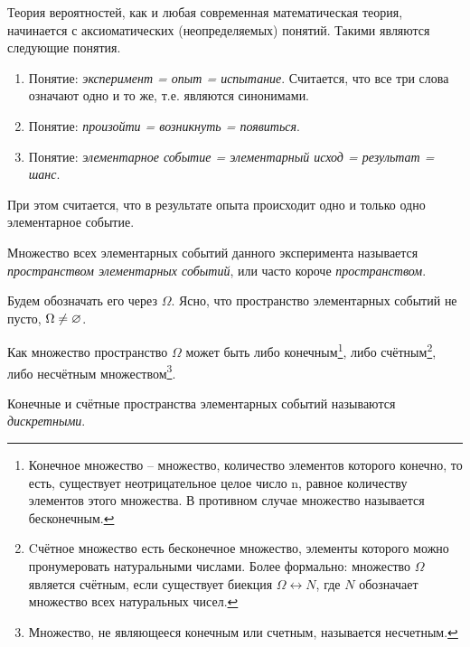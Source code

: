 

Теория вероятностей, как и любая современная математическая теория,
начинается с аксиоматических (неопределяемых) понятий. Такими являются
следующие понятия.
\begin{enumerate}
	\item Понятие: \textit{эксперимент = опыт = испытание}. Считается, что все три
слова означают одно и то же, т.е. являются синонимами.
	\item Понятие: \textit{произойти = возникнуть = появиться}.
	\item Понятие: \textit{элементарное событие = элементарный исход = результат
= шанс}.
\end{enumerate}

При этом считается, что в результате опыта происходит одно и только
одно элементарное событие.

\begin{definition}
	Множество всех элементарных событий данного эксперимента называется \textit{пространством элементарных событий}, или часто короче \textit{пространством}.
\end{definition}

Будем обозначать его через $\Omega$. 
Ясно, что пространство элементарных событий не пусто, $\Omega\ne\varnothing$.

Как множество пространство $\Omega$ может быть либо конечным\footnote{Конечное множество -- множество, количество элементов которого конечно, то есть, существует неотрицательное целое число n, равное количеству элементов этого множества. В противном случае множество
называется бесконечным.}, 
либо счётным\footnote{Cчётное множество есть бесконечное множество, элементы которого можно пронумеровать натуральными числами. Более формально: множество $\Omega$ является счётным, если существует биекция $\Omega\leftrightarrow N$, где $N$ обозначает множество всех натуральных чисел.}, 
либо несчётным множеством\footnote{Множество, не являющееся конечным или счетным, называется несчетным.}.

\begin{definition}
	Конечные и счётные пространства элементарных событий называются \textit{дискретными}.
\end{definition}

